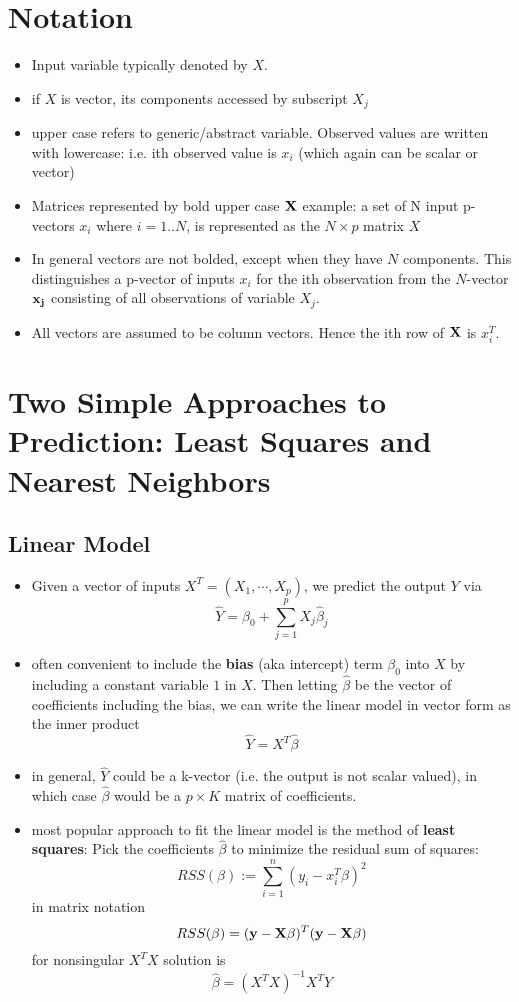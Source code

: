 \documentclass[a4paper]{report}
\newcommand{\<}{\textless}
\renewcommand{\>}{\textgreater}
\begin{document}
\section{Notation}
\begin{itemize}
  \item Input variable typically denoted by $X$. 
  \item if $X$ is vector, its components accessed by subscript $X_j$
  \item upper case refers to generic/abstract variable. Observed values are written with lowercase: i.e. ith observed value is $x_i$ (which again can be scalar or vector)
  \item Matrices represented by bold upper case $\bf X$
    \subitem example: a set of N input p-vectors $x_i$ where $i=1..N$, is represented as the $N\times p$ matrix $X$
  \item In general vectors are not bolded, except when they have $N$ components. This distinguishes a p-vector of inputs $x_i$ for the ith observation from the $N$-vector $\bf x_j$ consisting of all observations of variable $X_j$.
  \item All vectors are assumed to be column vectors. Hence the ith row of $\bf X$ is $x_i^T$.
\end{itemize}

\section{Two Simple Approaches to Prediction: Least Squares and Nearest Neighbors}
\subsection{Linear Model}
\begin{itemize}
  \item Given a vector of inputs $X^T = (X_1, \cdots, X_p)$, we predict the output $Y$ via
    $$ \hat{Y}  = \beta_0 + \sum_{j=1}^p X_j \hat{\beta}_j $$
  \item often convenient to include the {\bf bias} (aka intercept) term $\beta_0$  into $X$ by including a constant variable $1$ in $X$. Then letting $\hat{\beta}$ be the vector of coefficients including the bias, we can write the linear model in vector form as the inner product
    $$ \hat{Y} = X^T\hat{\beta} $$
  \item in general, $\hat{Y}$ could be a k-vector (i.e. the output is not scalar valued), in which case $\hat{\beta}$ would be a $p\times K$ matrix of coefficients.
  \item most popular approach to fit the linear model is the method of {\bf least squares}: Pick the coefficients $\hat{\beta}$ to minimize the residual sum of squares:
    $$ RSS(\beta) := \sum_{i=1}^n (y_i - x_i^T\beta)^2$$
    in matrix notation
    $$ RSS(\beta) = ({\bf y} - {\bf X}\beta)^T({\bf y} - {\bf X}\beta) $$
    \subitem for nonsingular $X^TX$ solution is
    $$ \hat{\beta} = \left(X^TX\right)^{-1} X^TY $$
\end{itemize}
\end{document}

